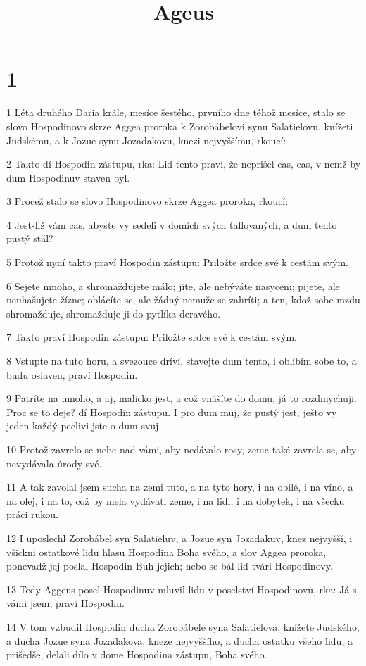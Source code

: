 

\title{Ageus}

\chapter{1}

\par 1 Léta druhého Daria krále, mesíce šestého, prvního dne téhož mesíce, stalo se slovo Hospodinovo skrze Aggea proroka k Zorobábelovi synu Salatielovu, knížeti Judskému, a k Jozue synu Jozadakovu, knezi nejvyššímu, rkoucí:
\par 2 Takto dí Hospodin zástupu, rka: Lid tento praví, že neprišel cas, cas, v nemž by dum Hospodinuv staven byl.
\par 3 Procež stalo se slovo Hospodinovo skrze Aggea proroka, rkoucí:
\par 4 Jest-liž vám cas, abyste vy sedeli v domích svých taflovaných, a dum tento pustý stál?
\par 5 Protož nyní takto praví Hospodin zástupu: Priložte srdce své k cestám svým.
\par 6 Sejete mnoho, a shromaždujete málo; jíte, ale nebýváte nasyceni; pijete, ale neuhašujete žízne; oblácíte se, ale žádný nemuže se zahríti; a ten, kdož sobe mzdu shromažduje, shromažduje ji do pytlíka deravého.
\par 7 Takto praví Hospodin zástupu: Priložte srdce své k cestám svým.
\par 8 Vstupte na tuto horu, a svezouce dríví, stavejte dum tento, i oblíbím sobe to, a budu oslaven, praví Hospodin.
\par 9 Patríte na mnoho, a aj, malicko jest, a což vnášíte do domu, já to rozdmychuji. Proc se to deje? dí Hospodin zástupu. I pro dum muj, že pustý jest, ješto vy jeden každý peclivi jste o dum svuj.
\par 10 Protož zavrelo se nebe nad vámi, aby nedávalo rosy, zeme také zavrela se, aby nevydávala úrody své.
\par 11 A tak zavolal jsem sucha na zemi tuto, a na tyto hory, i na obilé, i na víno, a na olej, i na to, což by mela vydávati zeme, i na lidi, i na dobytek, i na všecku práci rukou.
\par 12 I uposlechl Zorobábel syn Salatieluv, a Jozue syn Jozadakuv, knez nejvyšší, i všickni ostatkové lidu hlasu Hospodina Boha svého, a slov Aggea proroka, ponevadž jej poslal Hospodin Buh jejich; nebo se bál lid tvári Hospodinovy.
\par 13 Tedy Aggeus posel Hospodinuv mluvil lidu v poselství Hospodinovu, rka: Já s vámi jsem, praví Hospodin.
\par 14 V tom vzbudil Hospodin ducha Zorobábele syna Salatielova, knížete Judského, a ducha Jozue syna Jozadakova, kneze nejvyššího, a ducha ostatku všeho lidu, a prišedše, delali dílo v dome Hospodina zástupu, Boha svého.

